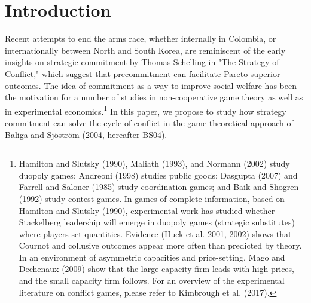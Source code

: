 \documentclass[11pt, letterpaper]{article}
\theoremstyle{plain}
\begin{document}
\section{Introduction}
\label{sec:intro}

Recent attempts to end the arms race, whether internally in Colombia, or internationally between North and South Korea, are reminiscent of the early insights on strategic commitment by Thomas Schelling in "The Strategy of Conflict," which suggest that precommitment can facilitate Pareto superior outcomes. The idea of commitment as a way to improve social welfare has been the motivation for a number of studies in non-cooperative game theory as well as in experimental economics.\footnote{Hamilton and Slutsky (1990), Maliath (1993),  and Normann (2002) study duopoly games; Andreoni (1998) studies public goods;  Dasgupta (2007) and Farrell and Saloner (1985) study coordination games; and Baik and Shogren (1992) study contest games.  In games of complete information, based on Hamilton and Slutsky (1990), experimental work has studied whether Stackelberg leadership will emerge in duopoly games (strategic substitutes) where players set quantities. Evidence (Huck et al. 2001, 2002) shows that Cournot and collusive outcomes appear more often than predicted by theory. In an environment of asymmetric capacities and price-setting, Mago and Dechenaux (2009) show that the large capacity firm leads with high prices, and the small capacity firm follows. For an overview of the experimental literature on conflict games, please refer to Kimbrough et  al. (2017). }  In this paper, we propose to study how strategy commitment can solve the cycle of conflict in the game theoretical approach of Baliga and Sj\"ostr\"om (2004, hereafter BS04). 
\end{document}
